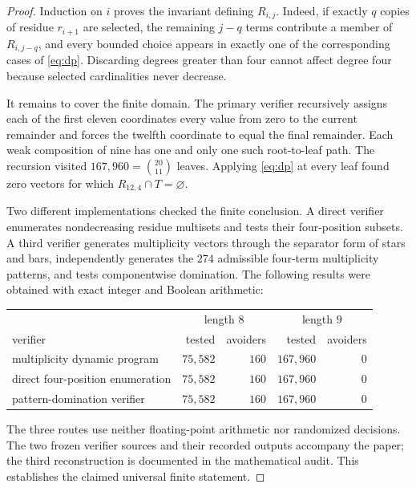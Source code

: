\documentclass[11pt]{article}
\begin{document}
\begin{proof}
Induction on $i$ proves the invariant defining $R_{i,j}$.  Indeed, if
exactly $q$ copies of residue $r_{i+1}$ are selected, the remaining
$j-q$ terms contribute a member of $R_{i,j-q}$, and every bounded choice
appears in exactly one of the corresponding cases of
\eqref{eq:dp}.  Discarding degrees greater than four cannot affect degree
four because selected cardinalities never decrease.

It remains to cover the finite domain.  The primary verifier recursively
assigns each of the first eleven coordinates every value from zero to the
current remainder and forces the twelfth coordinate to equal the final
remainder.  Each weak composition of nine has one and only one such
root-to-leaf path.  The recursion visited $167{,}960=\binom{20}{11}$
leaves.  Applying \eqref{eq:dp} at every leaf found zero vectors for which
$R_{12,4}\cap T=\varnothing$.

Two different implementations checked the finite conclusion.  A direct
verifier enumerates nondecreasing residue multisets and tests their
four-position subsets.  A third verifier generates multiplicity vectors
through the separator form of stars and bars, independently generates
the $274$ admissible four-term multiplicity patterns, and tests componentwise
domination.  The following results were obtained with exact integer and
Boolean arithmetic:
\begin{center}
\begin{tabular}{lrr|rr}
\hline
& \multicolumn{2}{c|}{length $8$} & \multicolumn{2}{c}{length $9$}\\
verifier & tested & avoiders & tested & avoiders\\
\hline
multiplicity dynamic program & $75{,}582$ & $160$ & $167{,}960$ & $0$\\
direct four-position enumeration & $75{,}582$ & $160$ & $167{,}960$ & $0$\\
pattern-domination verifier & $75{,}582$ & $160$ & $167{,}960$ & $0$\\
\hline
\end{tabular}
\end{center}
The three routes use neither floating-point arithmetic nor randomized
decisions.  The two frozen verifier sources and their recorded outputs
accompany the paper; the third reconstruction is documented in the
mathematical audit.  This establishes the claimed universal finite
statement.
\end{proof}
\end{document}

